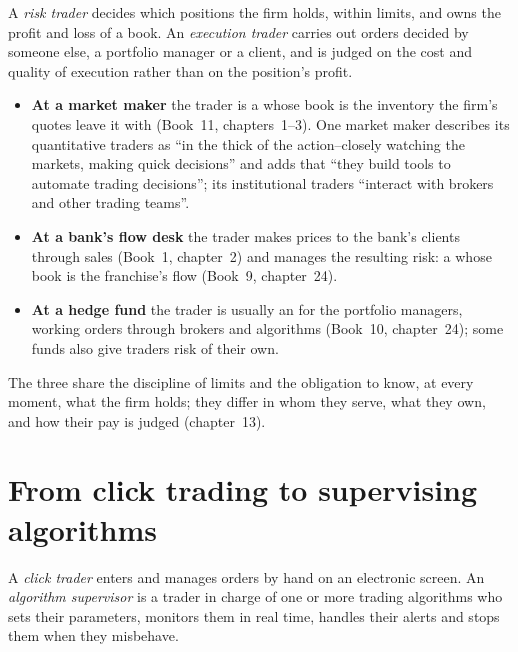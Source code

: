 \begin{definition}\label{def:in:trader:kinds}
A \emph{risk trader} decides which positions the firm holds, within limits, and owns the profit and
loss of a book. An \emph{execution trader} carries out orders decided by someone else, a portfolio
manager or a client, and is judged on the cost and quality of execution rather than on the position's profit.
\end{definition}

\begin{itemize}
\item \textbf{At a market maker} the trader is a  whose book is the inventory the firm's quotes leave it with
(Book~11, chapters~1--3). One market maker describes its quantitative traders as ``in the thick of the action--closely
watching the markets, making quick decisions'' and adds that ``they build tools to automate trading decisions''; its
institutional traders ``interact with brokers and other trading teams''.
\item \textbf{At a bank's flow desk} the trader makes prices to the bank's clients through sales (Book~1, chapter~2) and
manages the resulting risk: a  whose book is the franchise's flow (Book~9, chapter~24).
\item \textbf{At a hedge fund} the trader is usually an  for the portfolio managers, working orders
through brokers and algorithms (Book~10, chapter~24); some funds also give traders risk of their own.
\end{itemize}
The three share the discipline of limits and the obligation to know, at every moment, what the firm holds; they differ in
whom they serve, what they own, and how their pay is judged (chapter~13).

\section{From click trading to supervising algorithms}

\begin{definition}\label{def:in:trader:supervisor}
A \emph{click trader} enters and manages orders by hand on an electronic screen. An
\emph{algorithm supervisor} is a trader in charge of one or more trading algorithms who sets
their parameters, monitors them in real time, handles their alerts and stops them when they misbehave.
\end{definition}

